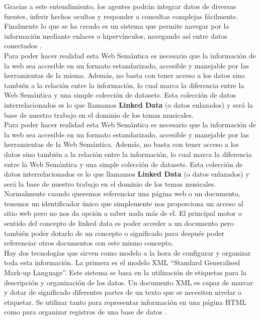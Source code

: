Gracias a este entendimiento, los agentes podrán integrar datos de diversas fuentes, inferir hechos ocultos y responder a consultas complejas fácilmente. Finalmente lo que se ha creado es un sistema que permite navegar por la información mediante enlaces o hipervínculos, navegando así entre datos conectados \cite{sakr2018}.\\

Para poder hacer realidad esta Web Semántica es necesario que la información de la web sea accesible en un formato estandarizado, accesible y manejable por las herramientas de la misma. Además, no basta con tener acceso a los datos sino también a la relación entre la información, lo cual marca la diferencia entre la Web Semántica y una simple colección de datasets. Esta colección de datos interrelacionados es lo que llamamos \textbf{Linked Data} (o datos enlazados) y será la base de nuestro trabajo en el dominio de los temas musicales.\\


Para poder hacer realidad esta Web Semántica es necesario que la información de la web sea accesible en un formato estandarizado, accesible y manejable por las herramientas de la Web Semántica. Además, no basta con tener acceso a los datos sino también a la relación entre la información, lo cual marca la diferencia entre la Web Semántica y una simple colección de datasets. Esta colección de datos interrelacionados es lo que llamamos \textbf{Linked Data} (o datos enlazados) y será la base de nuestro trabajo en el dominio de los temas musicales. Normalmente cuando queremos referenciar una página web o un documento, tenemos un identificador único que simplemente nos proporciona un acceso al sitio web pero no nos da opción a saber nada más de el. El principal motor o sentido del concepto de linked data es poder acceder a un documento pero también poder dotarlo de un concepto o significado para después poder referenciar otros documentos con este mismo concepto. \\

Hay dos tecnologías que sirven como modelo a la hora de configurar y organizar toda esta información. La primera es el modelo XML ``Standard Generalised Mark-up Language''. Este sistema se basa en la utilización de etiquetas para la descripción y organización de los datos. Un documento XML es capaz de marcar y dotar de significado diferentes partes de un texto que se necesiten nivelar o etiquetar. Se utilizar tanto para representar información en una página HTML como para organizar registros de una base de datos \cite{heath2011}. \\

